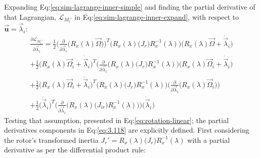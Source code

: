 Expanding Eq:\ref{eq:sim-lagrange-inner-simple} and finding the partial derivative of that Lagrangian, $\mathcal{L}_{M_i'}$ in Eq:\ref{eq:sim-lagrange-inner-expand}, with respect to $\vec{\mathbf{u}}=\vec{\lambda}_i$:
\begin{multline}\label{eq:3.118}
\frac{\partial\mathcal{L}_{M_i'}}{\partial\vec{\lambda}_i}=\frac{1}{2}\bigg(\frac{\partial}{\partial\vec{\lambda}_i}\Big(R_x(\lambda)\vec{\Omega}\Big)\bigg)^T\Big(R_x(\lambda)\big(J_r\big)R_x^{-1}(\lambda)\Big)\Big(R_x(\lambda)\vec{\Omega}+\dot{\vec{\lambda}}_i\Big)
\\
+\frac{1}{2}\Big(R_x(\lambda)\vec{\Omega}_i+\dot{\vec{\lambda}}_i\Big)^T\bigg(\frac{\partial}{\partial\vec{\lambda}_i}\Big(R_x(\lambda)\big(J_r\big)R_x^{-1}(\lambda)\Big)\bigg(R_x(\lambda)\vec{\Omega}_i+\dot{\vec{\lambda}}_i\Big)
\\
+\frac{1}{2}\Big(R_x(\lambda)\vec{\Omega}_i+\dot{\vec{\lambda}}_i\Big)^T\Big(R_x(\lambda)\big(J_r\big)R_x^{-1}(\lambda)\Big)\bigg(\frac{\partial}{\partial\vec{\lambda}_i}\Big(R_x(\lambda)\vec{\Omega}_i\Big)\bigg)
\\
+\frac{1}{2}\Big(\dot{\vec{\lambda}}_i\Big)^T\bigg(\frac{\partial}{\partial\vec{\lambda}_i}\Big(R_x(\lambda)\big(J_{ir}\big)R_x^{-1}(\lambda)\Big)\bigg)\Big(\dot{\vec{\lambda}}_i\Big)
\end{multline}
Testing that assumption, presented in Eq:\ref{eq:rotation-linear}; the partial derivatives components in Eq:\ref{eq:3.118} are explicitly defined. First considering the rotor's transformed inertia $J_r'=R_x(\lambda)\big(J_r\big)R_x^{-1}(\lambda)$ with a partial derivative as per the differential product rule:
